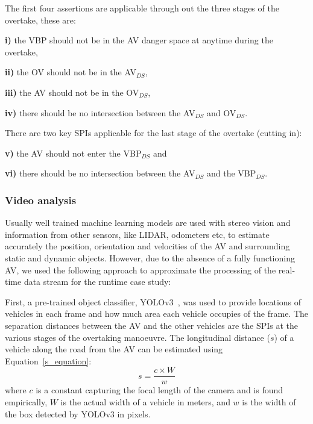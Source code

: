 The first four assertions are applicable through out the three stages of the overtake, these are:

\noindent \textbf{i)} the VBP should not be in the AV danger space at anytime during the overtake, 

\noindent \textbf{ii)} the OV should not be in the AV$_{DS}$, 

\noindent \textbf{iii)} the AV should not be in the OV$_{DS}$, 

\noindent \textbf{iv)} there should be no intersection between the AV$_{DS}$ and OV$_{DS}$.

There are two key SPIs applicable for the last stage of the overtake (cutting in):

\noindent \textbf{v)} the AV should not enter the VBP$_{DS}$ and 

\noindent \textbf{vi)} there should be no intersection between the AV$_{DS}$ and the VBP$_{DS}$. 

\subsubsection{Video analysis}
%
Usually well trained machine learning models are used with stereo vision and information from other sensors, like LIDAR, odometers etc, to estimate accurately the position, orientation and velocities of the AV and surrounding static and dynamic objects.
%
However, due to the absence of a fully functioning AV, we used the following approach to approximate the processing of the real-time data stream for the runtime case study:

First, a pre-trained object classifier, YOLOv3~\cite{Yolo}, was used to provide locations of vehicles in each frame and how much area each vehicle occupies of the frame. 
%
The separation distances between the AV and the other vehicles are the SPIs at the various stages of the overtaking manoeuvre. 
%
The longitudinal distance ($s$) of a vehicle along the road from the AV can be estimated 
using Equation~\ref{s_equation}:
\begin{equation}\label{s_equation}
    s = \frac{c\times W}{w}
\end{equation}
where $c$ is a constant capturing the focal length of the camera and is found empirically, $W$ is the actual width of a vehicle in meters, and $w$ is the width of the box detected by YOLOv3 in pixels.

